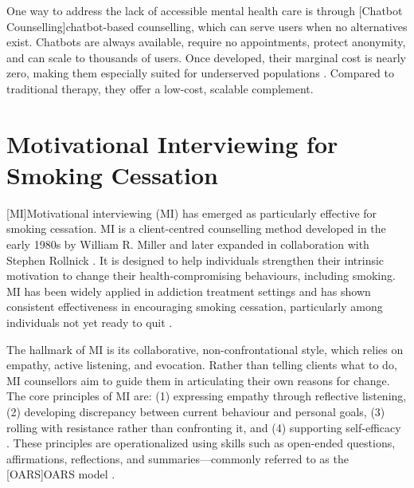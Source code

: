 One way to address the lack of accessible mental health care is through [Chatbot Counselling]chatbot-based counselling, which can serve users when no alternatives exist. Chatbots are always available, require no appointments, protect anonymity, and can scale to thousands of users. Once developed, their marginal cost is nearly zero, making them especially suited for underserved populations \cite{torous2017digital,miner2016smartphone}. Compared to traditional therapy, they offer a low-cost, scalable complement.



\section{Motivational Interviewing for Smoking Cessation}

[MI]Motivational interviewing (MI) has emerged as particularly effective for smoking cessation. MI is a client-centred counselling method developed in the early 1980s by William R. Miller and later expanded in collaboration with Stephen Rollnick \cite{miller1991motivational,MillerRollnick2013}. It is designed to help individuals
strengthen their intrinsic motivation to change their health-compromising behaviours, including smoking. MI has been widely applied in addiction treatment settings and has shown consistent effectiveness in encouraging smoking cessation, particularly among individuals not yet ready to quit \cite{bischof2021evidence,hettema2005meta}.

The hallmark of MI is its collaborative, non-confrontational style, which relies on empathy, active listening, and evocation. Rather than telling clients what to do, MI counsellors aim to guide them in articulating their own reasons for change. The core principles of MI are: (1) expressing empathy through reflective listening, (2) developing discrepancy between current behaviour and personal goals, (3) rolling with resistance rather than confronting it, and (4) supporting self-efficacy \cite{rollnick2008motivational}. These principles are operationalized using skills such as open-ended questions, affirmations, reflections, and summaries---commonly referred to as the [OARS]OARS model \cite{Miller_2023}.


